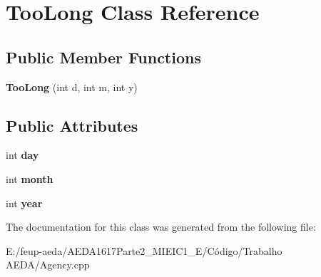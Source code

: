 \hypertarget{class_too_long}{}\section{Too\+Long Class Reference}
\label{class_too_long}
\subsection*{Public Member Functions}
\begin{DoxyCompactItemize}
\item 
\mbox{\label{class_too_long_a6221d3bc68906de82093e730a7e02358}} 
{\bfseries Too\+Long} (int d, int m, int y)
\end{DoxyCompactItemize}
\subsection*{Public Attributes}
\begin{DoxyCompactItemize}
\item 
\mbox{\label{class_too_long_a95367d0bbb25178e4df2b951e091318a}} 
int {\bfseries day}
\item 
\mbox{\label{class_too_long_a51bb8be6bc22cf1dd32f814734693889}} 
int {\bfseries month}
\item 
\mbox{\label{class_too_long_af665a5e1f89b62152ab6edfa92a2f109}} 
int {\bfseries year}
\end{DoxyCompactItemize}


The documentation for this class was generated from the following file\+:\begin{DoxyCompactItemize}
\item 
E\+:/feup-\/aeda/\+A\+E\+D\+A1617\+Parte2\+\_\+M\+I\+E\+I\+C1\+\_\+\+E/\+Código/\+Trabalho A\+E\+D\+A/Agency.\+cpp\end{DoxyCompactItemize}

